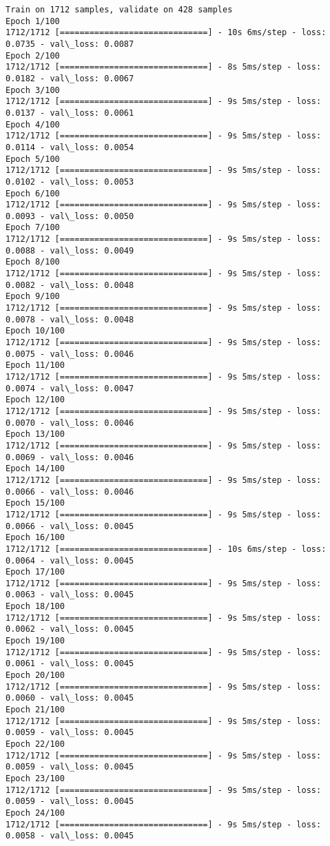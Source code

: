 \documentclass[11pt]{article}
\begin{document}
    \begin{Verbatim}[commandchars=\\\{\}]
Train on 1712 samples, validate on 428 samples
Epoch 1/100
1712/1712 [==============================] - 10s 6ms/step - loss: 0.0735 - val\_loss: 0.0087
Epoch 2/100
1712/1712 [==============================] - 8s 5ms/step - loss: 0.0182 - val\_loss: 0.0067
Epoch 3/100
1712/1712 [==============================] - 9s 5ms/step - loss: 0.0137 - val\_loss: 0.0061
Epoch 4/100
1712/1712 [==============================] - 9s 5ms/step - loss: 0.0114 - val\_loss: 0.0054
Epoch 5/100
1712/1712 [==============================] - 9s 5ms/step - loss: 0.0102 - val\_loss: 0.0053
Epoch 6/100
1712/1712 [==============================] - 9s 5ms/step - loss: 0.0093 - val\_loss: 0.0050
Epoch 7/100
1712/1712 [==============================] - 9s 5ms/step - loss: 0.0088 - val\_loss: 0.0049
Epoch 8/100
1712/1712 [==============================] - 9s 5ms/step - loss: 0.0082 - val\_loss: 0.0048
Epoch 9/100
1712/1712 [==============================] - 9s 5ms/step - loss: 0.0078 - val\_loss: 0.0048
Epoch 10/100
1712/1712 [==============================] - 9s 5ms/step - loss: 0.0075 - val\_loss: 0.0046
Epoch 11/100
1712/1712 [==============================] - 9s 5ms/step - loss: 0.0074 - val\_loss: 0.0047
Epoch 12/100
1712/1712 [==============================] - 9s 5ms/step - loss: 0.0070 - val\_loss: 0.0046
Epoch 13/100
1712/1712 [==============================] - 9s 5ms/step - loss: 0.0069 - val\_loss: 0.0046
Epoch 14/100
1712/1712 [==============================] - 9s 5ms/step - loss: 0.0066 - val\_loss: 0.0046
Epoch 15/100
1712/1712 [==============================] - 9s 5ms/step - loss: 0.0066 - val\_loss: 0.0045
Epoch 16/100
1712/1712 [==============================] - 10s 6ms/step - loss: 0.0064 - val\_loss: 0.0045
Epoch 17/100
1712/1712 [==============================] - 9s 5ms/step - loss: 0.0063 - val\_loss: 0.0045
Epoch 18/100
1712/1712 [==============================] - 9s 5ms/step - loss: 0.0062 - val\_loss: 0.0045
Epoch 19/100
1712/1712 [==============================] - 9s 5ms/step - loss: 0.0061 - val\_loss: 0.0045
Epoch 20/100
1712/1712 [==============================] - 9s 5ms/step - loss: 0.0060 - val\_loss: 0.0045
Epoch 21/100
1712/1712 [==============================] - 9s 5ms/step - loss: 0.0059 - val\_loss: 0.0045
Epoch 22/100
1712/1712 [==============================] - 9s 5ms/step - loss: 0.0059 - val\_loss: 0.0045
Epoch 23/100
1712/1712 [==============================] - 9s 5ms/step - loss: 0.0059 - val\_loss: 0.0045
Epoch 24/100
1712/1712 [==============================] - 9s 5ms/step - loss: 0.0058 - val\_loss: 0.0045

\end{Verbatim}
\end{document}
